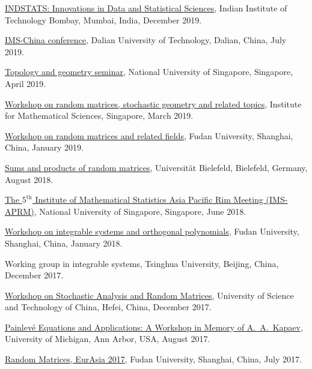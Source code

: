 \begin{item_list}
\item
  \href{https://www.intindstat.org/iisaconference2019/}{INDSTATS: Innovations in Data and Statistical Sciences}, Indian Institute of Technology Bombay, Mumbai, India, December 2019.
\item
  \href{http://www.ims-china.org/}{IMS-China conference}, Dalian University of Technology, Dalian, China, July 2019.
\item
  \href{http://www.math.nus.edu.sg/seminars.aspx?CatID=5}{Topology and geometry seminar}, National University of Singapore, Singapore, April 2019.
\item
  \href{https://sites.google.com/view/randommatrices2019nus}{Workshop on random matrices, stochastic geometry and related topics}, Institute for Mathematical Sciences, Singapore, March 2019.
\item
  \href{http://math.fudan.edu.cn/show.aspx?info_lb=766&flag=527&info_id=6117}{Workshop on random matrices and related fields}, Fudan University, Shanghai, China, January 2019.
\item
  \href{https://www.uni-bielefeld.de/(en)/ZiF/AG/2018/08-27-Akemann.html}{Sums and products of random matrices}, Universit\"{a}t Bielefeld, Bielefeld, Germany, August 2018.
\item
  \href{https://ims-aprm2018.stat.nus.edu.sg/}{The $5^{\text{th}}$ Institute of Mathematical Statistics Asia Pacific Rim Meeting (IMS-APRM)}, National University of Singapore, Singapore, June 2018.
\item
  \href{http://math.fudan.edu.cn/en/Data/View/-99994362}{Workshop on integrable systems and orthogonal polynomials}, Fudan University, Shanghai, China, January 2018.
\item
  Working group in integrable systems, Tsinghua University, Beijing, China, December 2017.
\item
  \href{http://wulab.ustc.edu.cn/bencandy.php?fid=61&id=1688}{Workshop on Stochastic Analysis and Random Matrices}, University of Science and Technology of China, Hefei, China, December 2017.
\item
  \href{https://lsa.umich.edu/math/centers-outreach/mcaim/painleve-equations-workshop--august-25-29--2017.html}{Painlev\'{e} Equations and Applications: A Workshop in Memory of A.~A.~Kapaev}, University of Michigan, Ann Arbor, USA, August 2017.
\item
  \href{http://www.fst.umac.mo/en/staff/documents/yayangchen/Workshop%20on%20RMT17.pdf}{Random Matrices, EurAsia 2017}, Fudan University, Shanghai, China, July 2017.

\end{item_list}
